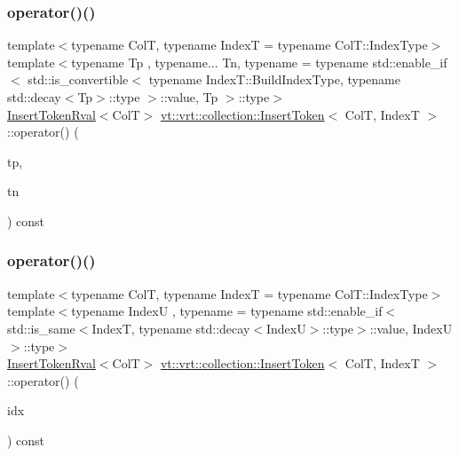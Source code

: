 \subsubsection{\texorpdfstring{operator()()}{operator()()}\hspace{0.1cm}{\footnotesize\ttfamily [1/2]}}
{\footnotesize\ttfamily template$<$typename ColT, typename IndexT = typename Col\+T\+::\+Index\+Type$>$ \\
template$<$typename Tp , typename... Tn, typename  = typename std\+::enable\+\_\+if$<$      std\+::is\+\_\+convertible$<$        typename Index\+T\+::\+Build\+Index\+Type, typename std\+::decay$<$\+Tp$>$\+::type      $>$\+::value, Tp    $>$\+::type$>$ \\
\hyperlink{structvt_1_1vrt_1_1collection_1_1_insert_token_rval}{Insert\+Token\+Rval}$<$ColT$>$ \hyperlink{structvt_1_1vrt_1_1collection_1_1_insert_token}{vt\+::vrt\+::collection\+::\+Insert\+Token}$<$ ColT, IndexT $>$\+::operator() (\begin{DoxyParamCaption}\item[{Tp \&\&}]{tp,  }\item[{Tn \&\&...}]{tn }\end{DoxyParamCaption}) const\hspace{0.3cm}{\ttfamily [inline]}}

\mbox{\label{structvt_1_1vrt_1_1collection_1_1_insert_token_a3f68c2bd0aecfe50588f8cfc14ecfa4f}} 
\subsubsection{\texorpdfstring{operator()()}{operator()()}\hspace{0.1cm}{\footnotesize\ttfamily [2/2]}}
{\footnotesize\ttfamily template$<$typename ColT, typename IndexT = typename Col\+T\+::\+Index\+Type$>$ \\
template$<$typename IndexU , typename  = typename std\+::enable\+\_\+if$<$      std\+::is\+\_\+same$<$\+Index\+T, typename std\+::decay$<$\+Index\+U$>$\+::type$>$\+::value, Index\+U    $>$\+::type$>$ \\
\hyperlink{structvt_1_1vrt_1_1collection_1_1_insert_token_rval}{Insert\+Token\+Rval}$<$ColT$>$ \hyperlink{structvt_1_1vrt_1_1collection_1_1_insert_token}{vt\+::vrt\+::collection\+::\+Insert\+Token}$<$ ColT, IndexT $>$\+::operator() (\begin{DoxyParamCaption}\item[{IndexU const \&}]{idx }\end{DoxyParamCaption}) const\hspace{0.3cm}{\ttfamily [inline]}}

